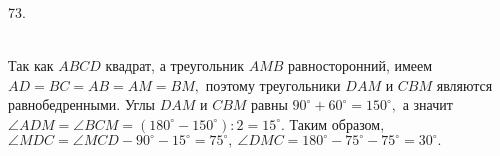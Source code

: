 73. \begin{figure}[ht!]
\end{figure}\\
Так как $ABCD$ квадрат, а треугольник $AMB$ равносторонний, имеем $AD=BC=AB=AM=BM,$ поэтому треугольники $DAM$ и $CBM$ являются равнобедренными. Углы $DAM$ и $CBM$ равны $90^\circ+60^\circ=150^\circ,$ а значит $\angle ADM=\angle BCM=(180^\circ-150^\circ):2=15^\circ.$ Таким образом, $\angle MDC=\angle MCD-90^\circ-15^\circ=75^\circ,\ \angle DMC=180^\circ-75^\circ-75^\circ=30^\circ.$\\

